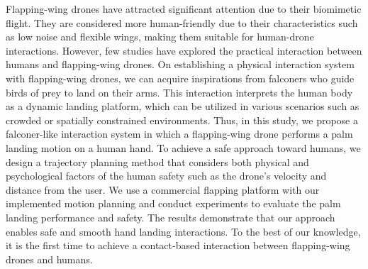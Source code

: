 Flapping-wing drones have attracted significant attention due to their biomimetic flight.
They are considered more human-friendly due to their characteristics such as low noise and flexible wings, 
making them suitable for human-drone interactions. 
However, few studies have explored the practical interaction between humans and flapping-wing drones. 
On establishing a physical interaction system with flapping-wing drones,
we can acquire inspirations from falconers who guide birds of prey to land on their arms.
This interaction interprets the human body as a dynamic landing platform, which can be utilized in various scenarios such as crowded or spatially constrained environments.
Thus, in this study, we propose a falconer-like interaction system in which a flapping-wing drone performs a palm landing motion on a human hand. 
To achieve a safe approach toward humans, we design a trajectory planning method that considers both physical and psychological factors of the human safety such as the drone's velocity and distance from the user.
We use a commercial flapping platform with our implemented motion planning and conduct experiments to evaluate the palm landing performance and safety.
The results demonstrate that our approach enables safe and smooth hand landing interactions. 
To the best of our knowledge, it is the first time to achieve a contact-based interaction between flapping-wing drones and humans.
